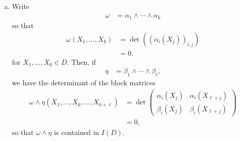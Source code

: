 \documentclass[10pt]{mypackage}
\begin{document}
\begin{solution}\hfill
  \begin{enumerate}[(a)]
    \item Write
      \begin{align*}
        \omega &= \alpha_1\wedge\cdots\wedge \alpha_k
      \end{align*}
      so that
      \begin{align*}
        \omega\left( X_1,\dots,X_k \right) &= \det\left( \left( \alpha_{i}\left( X_j \right) \right)_{i,j} \right)\\
                                           &= 0.
      \end{align*}
      for $X_1,\dots,X_k\in D$. Then, if
      \begin{align*}
        \eta &= \beta_1\wedge\cdots\wedge \beta_{\ell},
      \end{align*}
      we have the determinant of the block matrices
      \begin{align*}
        \omega\wedge\eta \left( X_1,\dots,X_{k},\dots,X_{k + \ell} \right) &= \det \begin{pmatrix}\alpha_{i}\left( X_j \right) & \alpha_{i}\left( X_{\ell + j} \right) \\ \beta_{i}\left( X_j \right) & \beta_i \left( X_{\ell + j} \right)\end{pmatrix}\\
                                                                           &= 0,
      \end{align*}
      so that $\omega\wedge\eta$ is contained in $I(D)$.
  \end{enumerate}
\end{solution}
\end{document}
